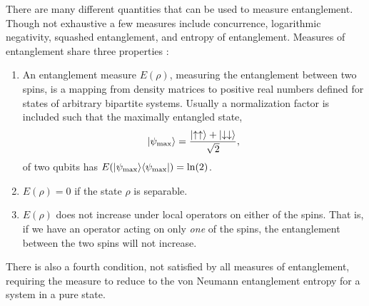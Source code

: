 There are many different quantities that can be used to measure entanglement. Though not exhaustive a few measures include concurrence, logarithmic negativity, squashed entanglement, and entropy of entanglement.
Measures of entanglement share three properties \cite{Plenio2005}:
\begin{enumerate}
\item An entanglement measure $E(\rho)$, measuring the entanglement between two spins, is a mapping from density matrices to positive real numbers defined for states of arbitrary bipartite systems.
Usually a normalization factor is included such that the maximally entangled state,
\begin{equation}
\lvert {\psi_{\rm max}} \rangle  = \frac{\lvert {\uparrow\uparrow} \rangle + \lvert {\downarrow\downarrow} \rangle}{\sqrt{2}},
\end{equation}
 of two qubits has $E(\lvert {\psi_{\rm max}} \rangle\langle {\psi_{\rm max}} \rvert) = \ln(2)$.
 \item  $E(\rho)=0$ if the state $\rho$ is separable.
 \item $E(\rho)$ does not increase under local operators on either of the spins.  That is, if we have an operator acting on only {\it one} of the spins, the entanglement between the two spins will not increase.
\end{enumerate}
There is also a fourth condition, not satisfied by all measures of entanglement, requiring the measure to reduce to the von Neumann entanglement entropy for a system in a pure state.


